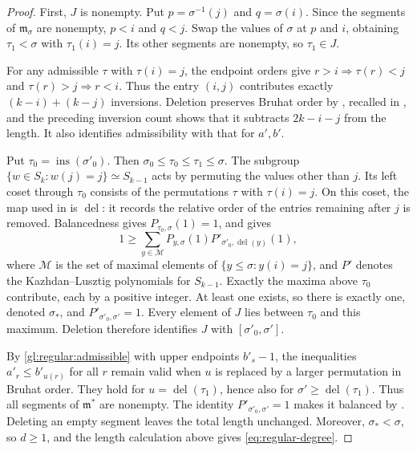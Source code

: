 \documentclass[10pt,a4paper]{article}
\theoremstyle{definition}
\theoremstyle{remark}
\numberwithin{equation}{section}
\newcommand{\fm}{\mathfrak{m}}
\begin{document}
\begin{proof}
First, $J$ is nonempty. Put $p=\sigma^{-1}(j)$ and $q=\sigma(i)$.
Since the segments of $\fm_\sigma$ are nonempty, $p<i$ and $q<j$.
Swap the values of $\sigma$ at $p$ and $i$, obtaining
$\tau_1<\sigma$ with $\tau_1(i)=j$. Its other segments are
nonempty, so $\tau_1\in J$.

For any admissible $\tau$ with $\tau(i)=j$, the endpoint orders give
$r>i\Rightarrow\tau(r)<j$ and $\tau(r)>j\Rightarrow r<i$.
Thus the entry $(i,j)$ contributes exactly $(k-i)+(k-j)$ inversions.
Deletion preserves Bruhat order by
\cite[Lemma~17]{BilleyWarrington2003}, recalled in
\cite[Lemma~5.5]{RegularLM2018}, and the preceding inversion count
shows that it subtracts $2k-i-j$ from the length. It also identifies admissibility
with that for $a',b'$.

Put $\tau_0=\operatorname{ins}(\sigma'_0)$. Then
$\sigma_0\leq\tau_0\leq\tau_1\leq\sigma$.
The subgroup $\{w\in S_k:w(j)=j\}\simeq S_{k-1}$ acts by
permuting the values other than $j$. Its left coset through $\tau_0$
consists of the permutations $\tau$ with $\tau(i)=j$.
On this coset, the map used in \cite[\S2.3]{RegularBilleyBraden2003}
is $\operatorname{del}$: it records the relative order of the entries
remaining after $j$ is removed.
Balancedness gives $P_{\tau_0,\sigma}(1)=1$, and
\cite[Theorem~4]{RegularBilleyBraden2003} gives
\[
 1\geq\sum_{y\in\mathcal M}
       P_{y,\sigma}(1)
       P'_{\sigma'_0,\operatorname{del}(y)}(1),
\]
where $\mathcal M$ is the set of maximal elements of
$\{y\leq\sigma:y(i)=j\}$, and $P'$ denotes the Kazhdan--Lusztig
polynomials for $S_{k-1}$. Exactly the maxima above $\tau_0$
contribute, each by a positive integer. At least one exists, so there
is exactly one, denoted $\sigma_*$, and
$P'_{\sigma'_0,\sigma'}=1$. Every element of $J$ lies between
$\tau_0$ and this maximum. Deletion therefore identifies $J$ with
$[\sigma'_0,\sigma']$.

By \eqref{gl:regular:admissible} with upper endpoints $b'_s-1$,
the inequalities $a'_r\leq b'_{u(r)}$ for all $r$ remain valid
when $u$ is replaced by a larger permutation in Bruhat order.
They hold for $u=\operatorname{del}(\tau_1)$, hence also for
$\sigma'\geq\operatorname{del}(\tau_1)$. Thus all segments of
$\fm^*$ are nonempty. The identity
$P'_{\sigma'_0,\sigma'}=1$ makes it balanced by
\cite[\S5.1 and Corollary~6.7]{RegularLM2018}.
Deleting an empty segment leaves the total length unchanged.
Moreover, $\sigma_*<\sigma$, so $d\geq1$, and the length calculation
above gives \eqref{eq:regular-degree}.


\end{proof}
\end{document}
